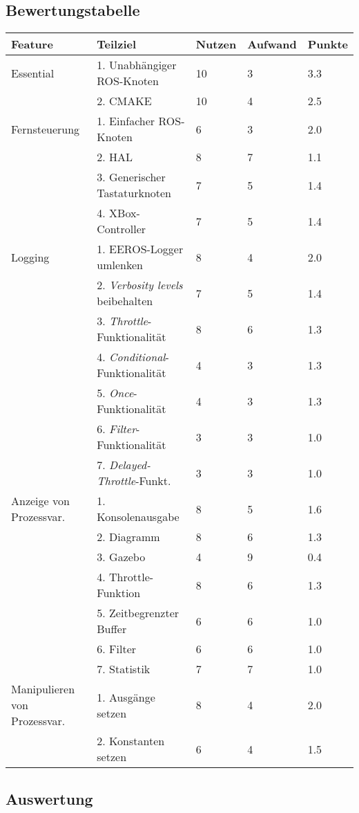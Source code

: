 \subsection{Bewertungstabelle}
\begin{tabular}
  { l								| l			 								l			 l			 l }
  \textbf{Feature}					& \textbf{Teilziel}	& \textbf{Nutzen}	& \textbf{Aufwand}	& \textbf{Punkte}	\\ \hline
  
  Essential							& 1. Unabhängiger ROS-Knoten				& 10		& 3			& 3.3		\\
  									& 2. CMAKE									& 10		& 4			& 2.5		\\ \hline
  Fernsteuerung						& 1. Einfacher ROS-Knoten					& 6			& 3			& 2.0		\\
  									& 2. HAL									& 8			& 7			& 1.1		\\
  									& 3. Generischer Tastaturknoten				& 7			& 5			& 1.4		\\ 
  									& 4. XBox-Controller						& 7			& 5			& 1.4		\\ \hline
  Logging 							& 1. EEROS-Logger umlenken					& 8			& 4			& 2.0		\\
  									& 2. \textit{Verbosity levels} beibehalten	& 7			& 5			& 1.4		\\
  									& 3. \textit{Throttle}-Funktionalität		& 8			& 6			& 1.3		\\
  									& 4. \textit{Conditional}-Funktionalität 	& 4			& 3			& 1.3		\\
  									& 5. \textit{Once}-Funktionalität			& 4			& 3			& 1.3		\\
  									& 6. \textit{Filter}-Funktionalität			& 3			& 3			& 1.0		\\
  									& 7. \textit{Delayed-Throttle}-Funkt.		& 3			& 3			& 1.0		\\ \hline
  Anzeige von Prozessvar.			& 1. Konsolenausgabe 						& 8			& 5			& 1.6		\\
  									& 2. Diagramm								& 8			& 6			& 1.3		\\
  									& 3. Gazebo									& 4			& 9			& 0.4		\\
  									& 4. Throttle-Funktion						& 8			& 6			& 1.3		\\
  									& 5. Zeitbegrenzter Buffer					& 6			& 6			& 1.0		\\
  									& 6. Filter									& 6			& 6			& 1.0		\\
  									& 7. Statistik								& 7			& 7			& 1.0		\\ \hline
  Manipulieren von Prozessvar.		& 1. Ausgänge setzen						& 8			& 4			& 2.0		\\
  									& 2. Konstanten setzen						& 6			& 4			& 1.5		\\ \hline
\end{tabular}

\subsection{Auswertung}
